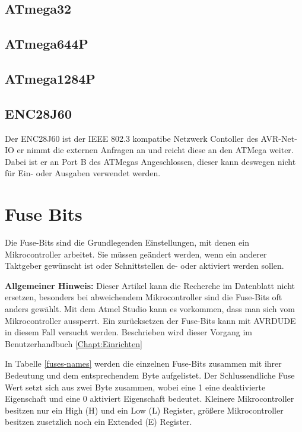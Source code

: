 \subsection{ATmega32}

\subsection{ATmega644P}

\subsection{ATmega1284P}

\subsection{ENC28J60}

Der ENC28J60 ist der IEEE 802.3 kompatibe Netzwerk Contoller des AVR-Net-IO er
nimmt die externen Anfragen an und reicht diese an den ATMega weiter. Dabei ist
er an Port B des ATMegas Angeschlossen, dieser kann deswegen nicht für Ein- oder
Ausgaben verwendet werden.

\section{Fuse Bits}
\label{chap:Fuse}

Die Fuse-Bits sind die Grundlegenden Einstellungen, mit denen ein
Mikrocontroller arbeitet. Sie müssen geändert werden, wenn ein anderer Taktgeber
gewünscht ist oder Schnittstellen de- oder aktiviert werden sollen.

\begin{myframe}
\textbf{Allgemeiner Hinweis:} Dieser Artikel kann die Recherche im Datenblatt
nicht ersetzen, besonders bei abweichendem Mikrocontroller sind die Fuse-Bits
oft anders gewählt. Mit dem Atmel Studio kann es vorkommen, dass man sich vom
Mikrocontroller aussperrt. Ein zurücksetzen der Fuse-Bits kann mit AVRDUDE
in diesem Fall versucht werden. Beschrieben wird dieser Vorgang im
Benutzerhandbuch \ref{Chapt:Einrichten}
\end{myframe}

In Tabelle \ref{fuses-names} werden die einzelnen Fuse-Bits zusammen mit ihrer
Bedeutung und dem entsprechendem Byte aufgelistet. Der Schlussendliche Fuse Wert
setzt sich aus zwei Byte zusammen, wobei eine 1 eine deaktivierte Eigenschaft und
eine 0 aktiviert Eigenschaft bedeutet. Kleinere Mikrocontroller besitzen nur ein
High (H) und ein Low (L) Register, größere Mikrocontroller besitzen zusetzlich
noch ein Extended (E) Register.

